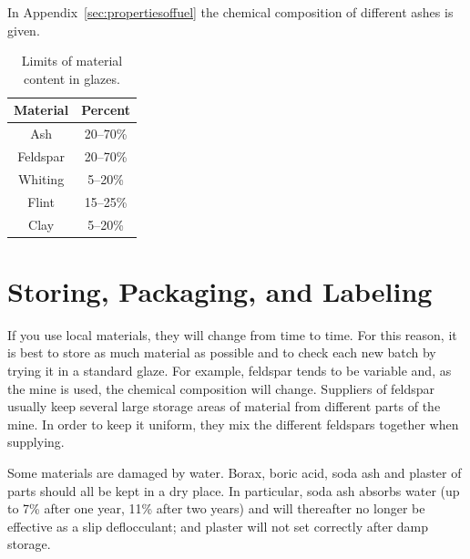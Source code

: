 In Appendix~\ref{sec:propertiesoffuel} the chemical composition of 
different ashes is given.
\begin{center}
        \renewcommand{\arraystretch}{1.5}
          \begin{table}\centering
    \begin{tabular}{|c|c|}\hline
      \textbf{Material}&\textbf{Percent}\\\hline\hline
      Ash&20--70\%\\\hline
      Feldspar&20--70\%\\\hline
      Whiting&5--20\%\\\hline
      Flint&15--25\%\\\hline
      Clay&5--20\%\\\hline
    \end{tabular}
    \caption{Limits of material content in glazes.}
    \label{tab:limits}
  \end{table}
\end{center}
\section{Storing, Packaging, and Labeling}
If you use local materials, they will change from time to time. For this 
reason, it is best to store as much material as possible and to check each new 
batch by trying it in a standard glaze. For example, feldspar tends to be 
variable and, as the mine is used, the chemical composition will change. 
Suppliers of feldspar usually keep several large storage areas of material from 
different parts of the mine. In order to keep it uniform, they mix the 
different feldspars together when supplying.

Some materials are damaged by water. Borax, boric acid, soda ash and plaster of 
parts should all be kept in a dry place. In particular, soda ash absorbs water 
(up to 7\% after one year, 11\% after two years) and will thereafter no longer 
be effective as a slip deflocculant; and plaster will not set correctly after 
damp storage.

